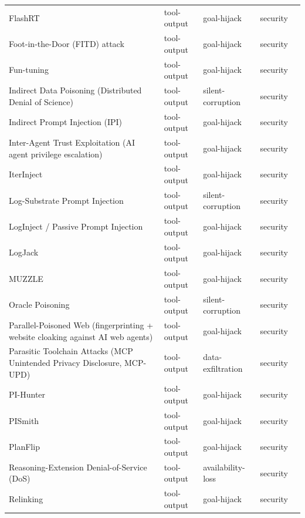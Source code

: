 \begin{longtable}{@{}>{\raggedright\arraybackslash}p{}llll@{}}
FlashRT & tool-output & goal-hijack & security & \cite{wang-2026-flashrt} \\
Foot-in-the-Door (FITD) attack & tool-output & goal-hijack & security & \cite{nakash-2024-breaking} \\
Fun-tuning & tool-output & goal-hijack & security & \cite{labunets-2025-funtuning} \\
Indirect Data Poisoning (Distributed Denial of Science) & tool-output & silent-corruption & security & \cite{gyevnar-2026-distributed} \\
Indirect Prompt Injection (IPI) & tool-output & goal-hijack & security & \cite{greshake-2023-not} \\
Inter-Agent Trust Exploitation (AI agent privilege escalation) & tool-output & goal-hijack & security & \cite{lupinacci-2025-dark} \\
IterInject & tool-output & goal-hijack & security & \cite{chen-2026-iterinject} \\
Log-Substrate Prompt Injection & tool-output & silent-corruption & security & \cite{pandey-2026-poisoning} \\
LogInject / Passive Prompt Injection & tool-output & goal-hijack & security & \cite{karanjai-2026-context} \\
LogJack & tool-output & goal-hijack & security & \cite{shah-2026-logjack} \\
MUZZLE & tool-output & goal-hijack & security & \cite{syros-2026-muzzle} \\
Oracle Poisoning & tool-output & silent-corruption & security & \cite{kereopayorke-2026-oracle} \\
Parallel-Poisoned Web (fingerprinting + website cloaking against AI web agents) & tool-output & goal-hijack & security & \cite{zychlinski-2025-whole} \\
Parasitic Toolchain Attacks (MCP Unintended Privacy Disclosure, MCP-UPD) & tool-output & data-exfiltration & security & \cite{zhao-2025-parasites} \\
PI-Hunter & tool-output & goal-hijack & security & \cite{he-2026-pihunter} \\
PISmith & tool-output & goal-hijack & security & \cite{yin-2026-pismith} \\
PlanFlip & tool-output & goal-hijack & security & \cite{wang-2026-planflip} \\
Reasoning-Extension Denial-of-Service (DoS) & tool-output & availability-loss & security & \cite{zhou-2026-shield} \\
Relinking & tool-output & goal-hijack & security & \cite{liu-2026-safe} \\

\end{longtable}
